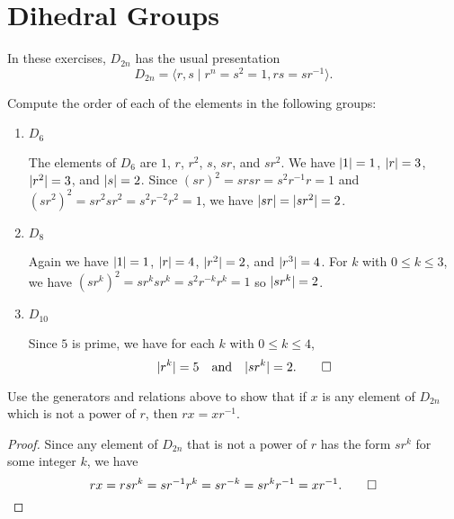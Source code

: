 \section{Dihedral Groups}

In these exercises, $D_{2n}$ has the usual presentation
\begin{equation*}
  D_{2n} = \langle r,s\mid r^n = s^2 = 1, rs = sr^{-1}\rangle.
\end{equation*}

 Compute the order of each of the elements in the following
groups:
\begin{enumerate}
\item $D_6$
  \begin{solution}
    The elements of $D_6$ are $1$, $r$, $r^2$, $s$, $sr$, and
    $sr^2$. We have $\lvert{1}\rvert = 1$, $\lvert{r}\rvert = 3$, $\lvert{r^2}\rvert = 3$, and
    $\lvert{s}\rvert = 2$. Since $(sr)^2 = srsr = s^2r^{-1}r = 1$ and
    $(sr^2)^2 = sr^2sr^2 = s^2r^{-2}r^2 = 1$, we have
    $\lvert{sr}\rvert = \lvert{sr^2}\rvert = 2$.
  \end{solution}
\item $D_8$
  \begin{solution}
    Again we have $\lvert{1}\rvert = 1$, $\lvert{r}\rvert = 4$, $\lvert{r^2}\rvert = 2$, and
    $\lvert{r^3}\rvert = 4$. For $k$ with $0\leq k\leq3$, we have
    $(sr^k)^2 = sr^ksr^k = s^2r^{-k}r^k = 1$ so $\lvert{sr^k}\rvert = 2$.
  \end{solution}
\item $D_{10}$
  \begin{solution}
    Since $5$ is prime, we have for each $k$ with $0\leq k\leq4$,
    \begin{equation*}
      \lvert{r^k}\rvert = 5
      \quad\text{and}\quad
      \lvert{sr^k}\rvert = 2. \qedhere
    \end{equation*}
  \end{solution}
\end{enumerate}

 Use the generators and relations above to show that if $x$
is any element of $D_{2n}$ which is not a power of $r$, then
$rx = xr^{-1}$.
\begin{proof}
  Since any element of $D_{2n}$ that is not a power of $r$ has the
  form $sr^k$ for some integer $k$, we have
  \begin{equation*}
    rx = rsr^k = sr^{-1}r^k = sr^{-k} = sr^kr^{-1} = xr^{-1}. \qedhere
  \end{equation*}
\end{proof}

